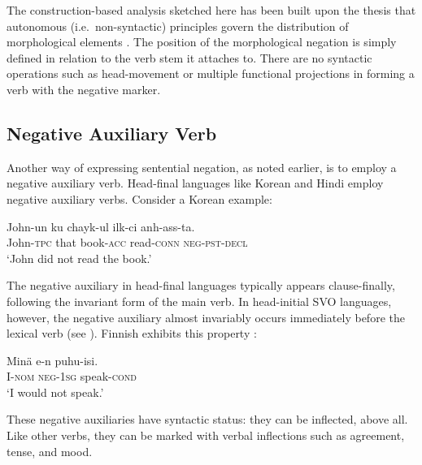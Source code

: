 \documentclass[output=paper]{langsci/langscibook}
\begin{document}
{The construction-based analysis sketched here
  has been built upon the
thesis that autonomous (i.e.\ non-syntactic) principles govern the
distribution of morphological elements \citet{BM:95}.
The position of the morphological negation is simply
defined in relation to
the verb stem it attaches to. There are no syntactic operations such
as head-movement or multiple functional projections in forming
a verb with the negative marker.



\subsection{Negative Auxiliary Verb}

Another way of expressing sentential negation, as noted earlier, is to employ
a negative auxiliary
verb. Head-final languages like Korean and Hindi employ
negative auxiliary verbs. Consider a Korean example:

%



\ea
\gll John-un ku chayk-ul ilk-ci anh-ass-ta. \\
     John-\textsc{tpc} that book-\textsc{acc} read-\textsc{conn} \textsc{neg}-\textsc{pst}-\textsc{decl}  \\
\glt `John did not read the book.'
\z

\noindent
The negative auxiliary in head-final languages
typically appears
clause-finally, following the invariant form of the main verb.
In head-initial SVO languages, however, the negative auxiliary
almost invariably occurs immediately before the lexical verb
(see \citet{Payne:85}). Finnish exhibits this property \citep{Mitchell:91}:

\ea
\gll Min\"{a} e-n puhu-isi. \\
     I-\textsc{nom} \textsc{neg}-\textsc{1sg} speak-\textsc{cond} \\
\glt `I would not speak.'
\z


\noindent
These negative auxiliaries have syntactic status: they can be
inflected, above all. Like other verbs, they can be marked
with verbal inflections such as agreement, tense, and mood.

}
\end{document}
